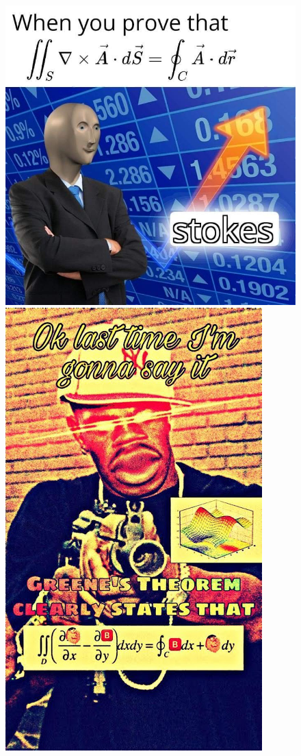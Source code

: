 \documentclass[handout, aspectratio=169]{beamer}
\begin{document}
\begin{frame} 
	\begin{figure}[t]
		\begin{minipage}{0.48\textwidth}
			\centering
			\includegraphics[width=5 cm]{10.jpg}
			
		\end{minipage}
		\begin{minipage}{0.48\textwidth}
			\centering
			\includegraphics[width=5 cm]{22.jpg}
			
		\end{minipage}
	\end{figure}
\end{frame}
\end{document}
